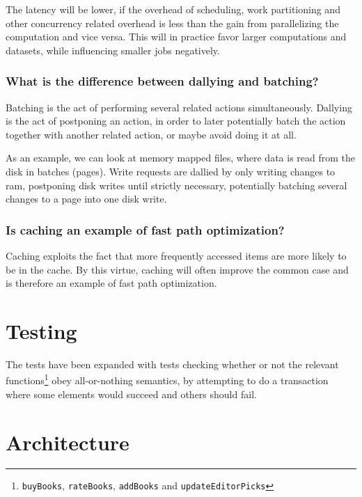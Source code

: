 \documentclass[11pt,a4paper]{article}
\begin{document}
The latency will be lower, if the overhead of scheduling, work partitioning and
other concurrency related overhead is less than the gain from parallelizing the
computation and vice versa. This will in practice favor larger computations and
datasets, while influencing smaller jobs negatively.

\subsubsection{What is the difference between dallying and batching?}

Batching is the act of performing several related actions simultaneously.
Dallying is the act of postponing an action, in order to later potentially batch
the action together with another related action, or maybe avoid doing it at all.

As an example, we can look at memory mapped files, where data is read from the
disk in batches (pages).
Write requests are dallied by only writing changes to ram, postponing disk
writes until strictly necessary, potentially batching several changes to a page
into one disk write.

\subsubsection{Is caching an example of fast path optimization?}

Caching exploits the fact that more frequently accessed items are more likely
to be in the cache. By this virtue, caching will often improve the common case
and is therefore an example of fast path optimization.

\section{Testing}

The tests have been expanded with tests checking whether or not the relevant
functions\footnote{\texttt{buyBooks}, \texttt{rateBooks}, \texttt{addBooks}
and \texttt{updateEditorPicks}} obey all-or-nothing semantics, by attempting
to do a transaction where some elements would succeed and others should fail.

\section{Architecture}
\end{document}
